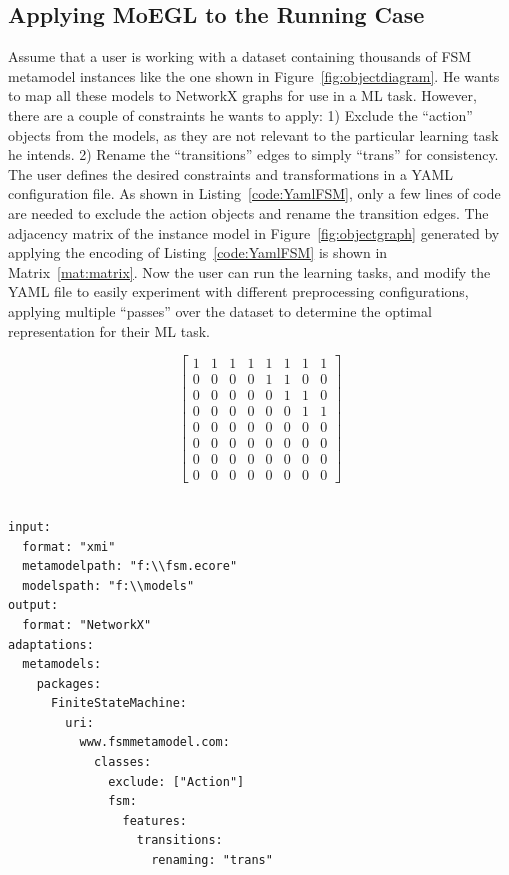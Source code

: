 \documentclass[journal,article,submit,moreauthors,technologies]{Definitions/mdpi}
\begin{document}
\subsection{Applying MoEGL to the Running Case}\label{sec:applying}
Assume that a user is working with a dataset containing thousands of FSM metamodel instances like the one shown in Figure~\ref{fig:objectdiagram}. He wants to map all these models to NetworkX graphs for use in a ML task. However, there are a couple of constraints he wants to apply: 1) Exclude the ``action'' objects from the models, as they are not relevant to the particular learning task he intends. 2) Rename the ``transitions'' edges to simply ``trans'' for consistency.
The user defines the desired constraints and transformations in a YAML configuration file. As shown in Listing~\ref{code:YamlFSM}, only a few lines of code are needed to exclude the action objects and rename the transition edges.
The adjacency matrix of the instance model in Figure~\ref{fig:objectgraph} generated by applying the encoding of Listing~\ref{code:YamlFSM} is shown in Matrix~\ref{mat:matrix}.
Now the user can run the learning tasks, and modify the YAML file to easily experiment with different preprocessing configurations, applying multiple ``passes'' over the dataset to determine the optimal representation for their ML task.

\begin{mat}[H]
\begin{equation}
    \begin{bmatrix}
1 & 1 & 1 & 1 & 1 & 1 & 1 & 1 \\
0 & 0 & 0 & 0 & 1 & 1 & 0 & 0 \\
0 & 0 & 0 & 0 & 0 & 1 & 1 & 0 \\
0 & 0 & 0 & 0 & 0 & 0 & 1 & 1 \\
0 & 0 & 0 & 0 & 0 & 0 & 0 & 0 \\
0 & 0 & 0 & 0 & 0 & 0 & 0 & 0 \\
0 & 0 & 0 & 0 & 0 & 0 & 0 & 0 \\
0 & 0 & 0 & 0 & 0 & 0 & 0 & 0
    \end{bmatrix}
\end{equation}
\caption{Adjacency matrix of the instance model in Figure~\ref{fig:objectgraph} generated with applying the encoding of Listing~\ref{code:YamlFSM}.}
\label{mat:matrix}
\end{mat}


\begin{program_}[H]
\footnotesize
\begin{verbatim}

input:
  format: "xmi"
  metamodelpath: "f:\\fsm.ecore"
  modelspath: "f:\\models"
output:
  format: "NetworkX"
adaptations:
  metamodels:
    packages:
      FiniteStateMachine:
        uri:
          www.fsmmetamodel.com:
            classes:
              exclude: ["Action"]
              fsm:
                features:
                  transitions:
                    renaming: "trans"
\end{verbatim}
\caption{A sample MoEGL program for encoding instance models similar to Figure~\ref{fig:objectdiagram}.}
\label{code:YamlFSM}
\end{program_}
\end{document}
